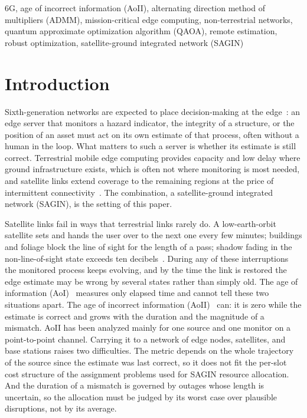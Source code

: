 \begin{IEEEkeywords}
6G, age of incorrect information (AoII), alternating direction method of multipliers (ADMM), mission-critical edge
computing, non-terrestrial networks, quantum approximate optimization algorithm (QAOA), remote estimation, robust
optimization, satellite-ground integrated network (SAGIN)
\end{IEEEkeywords}

\IEEEpeerreviewmaketitle

\section{Introduction}

Sixth-generation networks are expected to place decision-making at the edge~\cite{Saad2020}: an edge server that
monitors a hazard indicator, the integrity of a structure, or the position of an asset must act on its own estimate of
that process, often without a human in the loop. What matters to such a server is whether its estimate is still
correct. Terrestrial mobile edge computing provides capacity and low delay where ground infrastructure exists, which is
often not where monitoring is most needed, and satellite links extend coverage to the remaining regions at the price of
intermittent connectivity~\cite{Giordani2021}. The combination, a satellite-ground integrated network (SAGIN), is the
setting of this paper.

Satellite links fail in ways that terrestrial links rarely do. A low-earth-orbit satellite sets and hands the user over
to the next one every few minutes; buildings and foliage block the line of sight for the length of a pass; shadow
fading in the non-line-of-sight state exceeds ten decibels~\cite{TR38811}. During any of these interruptions the
monitored process keeps evolving, and by the time the link is restored the edge estimate may be wrong by several
states rather than simply old. The age of information (AoI)~\cite{Kaul2012, Yates2021} measures only elapsed time and
cannot tell these two situations apart. The age of incorrect information (AoII)~\cite{Maatouk2020, Maatouk2023} can:
it is zero while the estimate is correct and grows with the duration and the magnitude of a mismatch. AoII has been
analyzed mainly for one source and one monitor on a point-to-point channel. Carrying it to a network of edge nodes,
satellites, and base stations raises two difficulties. The metric depends on the whole trajectory of the source since
the estimate was last correct, so it does not fit the per-slot cost structure of the assignment problems used for
SAGIN resource allocation. And the duration of a mismatch is governed by outages whose length is uncertain, so the
allocation must be judged by its worst case over plausible disruptions, not by its average.

